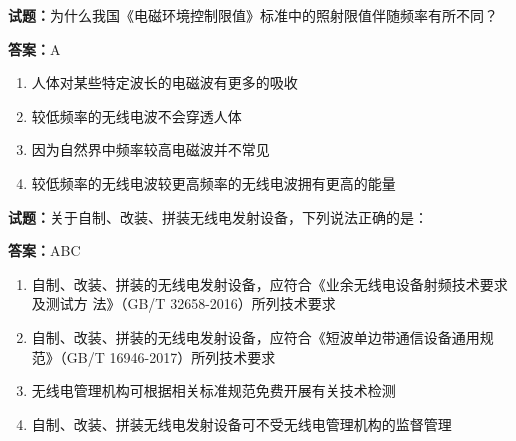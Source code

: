 \documentclass{ctexbook}
\begin{document}




\vspace{1em}

\textbf{试题：}为什么我国《电磁环境控制限值》标准中的照射限值伴随频率有所不同？ 

\textbf{答案：}A 

\begin{enumerate}[leftmargin=3em]
  \item 人体对某些特定波长的电磁波有更多的吸收 

  \item 较低频率的无线电波不会穿透人体 

  \item 因为自然界中频率较高电磁波并不常见 

  \item 较低频率的无线电波较更高频率的无线电波拥有更高的能量 

\end{enumerate}





\vspace{1em}

\textbf{试题：}关于自制、改装、拼装无线电发射设备，下列说法正确的是： 

\textbf{答案：}ABC 

\begin{enumerate}[leftmargin=3em]
  \item 自制、改装、拼装的无线电发射设备，应符合《业余无线电设备射频技术要求及测试方
法》（GB/T 32658-2016）所列技术要求 

  \item 自制、改装、拼装的无线电发射设备，应符合《短波单边带通信设备通用规范》（GB/T 
16946-2017）所列技术要求 

  \item 无线电管理机构可根据相关标准规范免费开展有关技术检测 

  \item 自制、改装、拼装无线电发射设备可不受无线电管理机构的监督管理 

\end{enumerate}





\vspace{1em}
\end{document}
